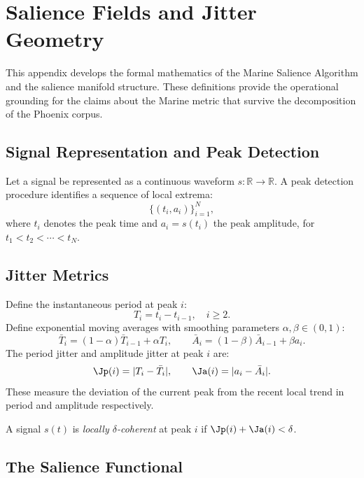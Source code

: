 
\chapter{Salience Fields and Jitter Geometry}
\label{app:salience}

\noindent
This appendix develops the formal mathematics of the
Marine Salience Algorithm and the salience manifold
structure. These definitions provide the operational
grounding for the \LevelI{} claims about the Marine
metric that survive the decomposition of the Phoenix
corpus.

\section{Signal Representation and Peak Detection}
\label{app-b:peaks}

Let a signal be represented as a continuous waveform
$s : \mathbb{R} \to \mathbb{R}$. A peak detection
procedure identifies a sequence of local extrema:
\[
  \{(t_i, a_i)\}_{i=1}^{N},
\]
where $t_i$ denotes the peak time and $a_i = s(t_i)$
the peak amplitude, for $t_1 < t_2 < \cdots < t_N$.

\section{Jitter Metrics}
\label{app-b:jitter}

Define the instantaneous period at peak $i$:
\[
  T_i = t_i - t_{i-1}, \quad i \ge 2.
\]
Define exponential moving averages with smoothing
parameters $\alpha, \beta \in (0,1)$:
\[
  \bar{T}_i = (1-\alpha)\bar{T}_{i-1} + \alpha T_i,
  \qquad
  \bar{A}_i = (1-\beta)\bar{A}_{i-1} + \beta a_i.
\]
The period jitter and amplitude jitter at peak $i$ are:
\[
  \Jp(i) = |T_i - \bar{T}_i|, \qquad
  \Ja(i) = |a_i - \bar{A}_i|.
\]
These measure the deviation of the current peak from
the recent local trend in period and amplitude respectively.

\begin{definition}
A signal $s(t)$ is \emph{locally $\delta$-coherent}
at peak $i$ if $\Jp(i) + \Ja(i) < \delta$.
\end{definition}

\section{The Salience Functional}
\label{app-b:salience-functional}

